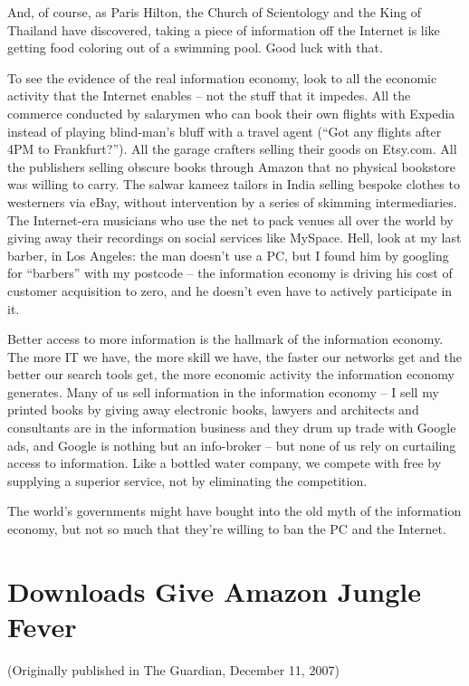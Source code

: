And, of course, as Paris Hilton, the Church of Scientology and the
King of Thailand have discovered, taking a piece of information off
the Internet is like getting food coloring out of a swimming pool.
Good luck with that.

To see the evidence of the real information economy, look to all
the economic activity that the Internet enables -- not the stuff
that it impedes. All the commerce conducted by salarymen who can
book their own flights with Expedia instead of playing blind-man's
bluff with a travel agent (``Got any flights after 4PM to
Frankfurt?''). All the garage crafters selling their goods on
Etsy.com. All the publishers selling obscure books through Amazon
that no physical bookstore was willing to carry. The salwar kameez
tailors in India selling bespoke clothes to westerners via eBay,
without intervention by a series of skimming intermediaries. The
Internet-era musicians who use the net to pack venues all over the
world by giving away their recordings on social services like
MySpace. Hell, look at my last barber, in Los Angeles: the man
doesn't use a PC, but I found him by googling for ``barbers'' with my
postcode -- the information economy is driving his cost of customer
acquisition to zero, and he doesn't even have to actively
participate in it.

Better access to more information is the hallmark of the
information economy. The more IT we have, the more skill we have,
the faster our networks get and the better our search tools get,
the more economic activity the information economy generates. Many
of us sell information in the information economy -- I sell my
printed books by giving away electronic books, lawyers and
architects and consultants are in the information business and they
drum up trade with Google ads, and Google is nothing but an
info-broker -- but none of us rely on curtailing access to
information. Like a bottled water company, we compete with free by
supplying a superior service, not by eliminating the competition.

The world's governments might have bought into the old myth of the
information economy, but not so much that they're willing to ban
the PC and the Internet.

\section{Downloads Give Amazon Jungle Fever}

(Originally published in The Guardian, December 11, 2007)

